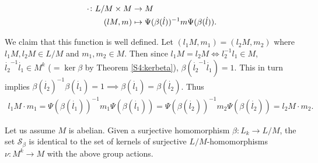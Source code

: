 \begin{align*}
    \cdot \colon L/M \times M &\rightarrow M \\
                (lM, m)  &\mapsto \Psi(\beta(\dot{l}))^{-1}m\Psi(\beta(\dot{l})).
\end{align*}

We claim that this function is well defined. 
Let $(l_1M, m_1) = (l_2M, m_2)$ where $l_1M, l_2M \in L/M$ and $m_1, m_2 \in M$. Then since $l_1M = l_2M \iff l_2^{-1}l_1 \in M$, $\dot{l_2}^{-1}\dot{l_1} \in M^k$ ($= \ker \beta$ by Theorem \ref{S4:kerbeta}), $\beta(\dot{l_2}^{-1}\dot{l_1}) = 1$. 
This in turn implies $ \beta(\dot{l_2})^{-1}\beta(\dot{l_1}) = 1 \implies \beta(\dot{l_1}) = \beta(\dot{l_2})$. 
Thus 
\begin{align*}
    l_1M \cdot m_1 = \Psi(\beta(\dot{l_1}))^{-1}m_1\Psi(\beta(\dot{l_1})) = \Psi(\beta(\dot{l_2}))^{-1}m_2\Psi(\beta(\dot{l_2})) = l_2M \cdot m_2.
\end{align*}

\begin{theorem}
    \label{S4:LMhom}
    Let us assume $M$ is abelian. Given a surjective homomorphism $\beta \colon L_k \rightarrow L/M$, the set $\mathscr{S}_\beta$ is identical to the set of kernels of surjective $L/M$-homomorphisms $\nu \colon M^k \rightarrow M$ with the above group actions.
\end{theorem}

